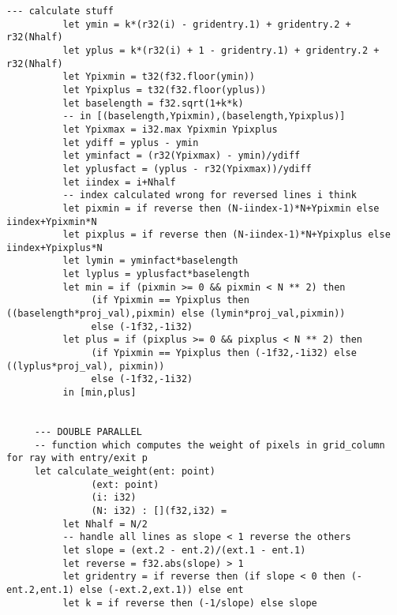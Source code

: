 \begin{lstlisting}[language=Futhark]
          --- calculate stuff
          let ymin = k*(r32(i) - gridentry.1) + gridentry.2 + r32(Nhalf)
          let yplus = k*(r32(i) + 1 - gridentry.1) + gridentry.2 + r32(Nhalf)
          let Ypixmin = t32(f32.floor(ymin))
          let Ypixplus = t32(f32.floor(yplus))
          let baselength = f32.sqrt(1+k*k)
          -- in [(baselength,Ypixmin),(baselength,Ypixplus)]
          let Ypixmax = i32.max Ypixmin Ypixplus
          let ydiff = yplus - ymin
          let yminfact = (r32(Ypixmax) - ymin)/ydiff
          let yplusfact = (yplus - r32(Ypixmax))/ydiff
          let iindex = i+Nhalf
          -- index calculated wrong for reversed lines i think
          let pixmin = if reverse then (N-iindex-1)*N+Ypixmin else iindex+Ypixmin*N
          let pixplus = if reverse then (N-iindex-1)*N+Ypixplus else iindex+Ypixplus*N
          let lymin = yminfact*baselength
          let lyplus = yplusfact*baselength
          let min = if (pixmin >= 0 && pixmin < N ** 2) then
               (if Ypixmin == Ypixplus then ((baselength*proj_val),pixmin) else (lymin*proj_val,pixmin))
               else (-1f32,-1i32)
          let plus = if (pixplus >= 0 && pixplus < N ** 2) then
               (if Ypixmin == Ypixplus then (-1f32,-1i32) else ((lyplus*proj_val), pixmin))
               else (-1f32,-1i32)
          in [min,plus]


     --- DOUBLE PARALLEL
     -- function which computes the weight of pixels in grid_column for ray with entry/exit p
     let calculate_weight(ent: point)
               (ext: point)
               (i: i32)
               (N: i32) : [](f32,i32) =
          let Nhalf = N/2
          -- handle all lines as slope < 1 reverse the others
          let slope = (ext.2 - ent.2)/(ext.1 - ent.1)
          let reverse = f32.abs(slope) > 1
          let gridentry = if reverse then (if slope < 0 then (-ent.2,ent.1) else (-ext.2,ext.1)) else ent
          let k = if reverse then (-1/slope) else slope


\end{lstlisting}
